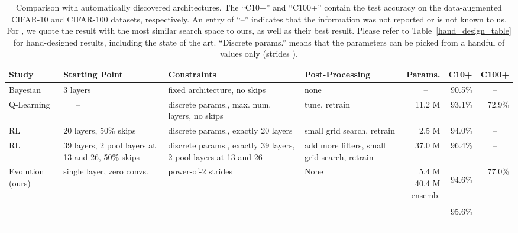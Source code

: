 \documentclass{article}
\renewcommand{\cite}[1]{\citep{#1}}
\newcommand{\bestacc}{94.6}
\newcommand{\bestparams}{5.4 M}
\newcommand{\onehundredacc}{77.0}
\newcommand{\onehundredparams}{40.4 M}
\newcommand{\ensembleparams}{ensemb.}
\newcommand{\ensembleacc}{95.6}
\begin{document}
\begin{table*}
\caption{Comparison with automatically discovered architectures. The ``C10+'' and ``C100+'' contain the test accuracy on the data-augmented CIFAR-10 and CIFAR-100 datasets, respectively. An entry of ``--'' indicates that the information was not reported or is not known to us. For \citet{zoph2016neural}, we quote the result with the most similar search space to ours, as well as their best result. Please refer to Table~\ref{hand_design_table} for hand-designed results, including the state of the art. ``Discrete params.'' means that the parameters can be picked from a handful of values only (\eg strides ).}
\label{automated_design_table}
\vskip 0.1in  \begin{center}
\begin{small}
\begin{sc}
\begin{tabular}{P{2.0 cm}P{2.7 cm}P{3.8 cm}P{2.8 cm}rrr}
\hline
\abovespace\belowspace
Study & Starting Point & Constraints & Post-Processing & Params. & C10+ & C100+ \\
\hline
\abovespace
Bayesian \cite{snoek2012practical} & 3 layers & fixed architecture, no skips & none & --~~~ & 90.5\% & --~~~ \\
\rule{0pt}{3ex}Q-Learning \cite{baker2016designing} & ~~~-- & discrete params., max. num. layers, no skips & tune, retrain & 11.2 M & 93.1\% & 72.9\% \\
\rule{0pt}{3ex}RL \cite{zoph2016neural} & 20 layers, 50\% skips & discrete params., exactly 20 layers & small grid search, retrain & 2.5 M & 94.0\% & --~~~ \\
\rule{0pt}{3ex}RL \cite{zoph2016neural} & 39 layers, 2 pool layers at 13 and 26, 50\% skips & discrete params., exactly 39 layers, 2 pool layers at 13 and 26 & add more filters, small grid search, retrain & 37.0 M & 96.4\% & --~~~ \\
\rule{0pt}{3ex}Evolution (ours) & single layer, zero convs. & power-of-2 strides & None & \parbox{1cm}{\vspace{0.2cm} \bestparams \\ \onehundredparams \\ \ensembleparams} & \parbox{1cm}{\vspace{0.2cm} \hfill \bestacc\% \\ \\ \parbox{1cm}{\hfill \ensembleacc\%} } & \parbox{1cm}{\vspace{0.2cm} \hfill \onehundredacc\%} \\
\end{tabular}
\end{sc}
\end{small}
\end{center}
\vskip -0.1in
\end{table*}
\end{document}
